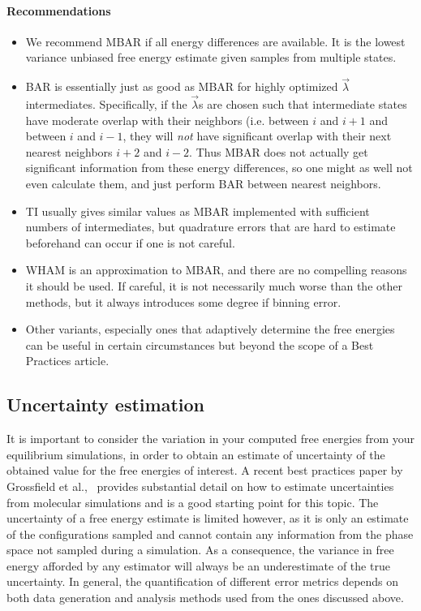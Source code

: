 \documentclass[9pt,bestpractices]{livecoms}
\begin{document}
\paragraph{Recommendations}
\begin{itemize}
\item We recommend MBAR if all energy differences are available. It is the lowest variance unbiased free energy estimate given samples from multiple states.
\item BAR is essentially just as good as MBAR for highly optimized $\vec{\lambda}$ intermediates. Specifically, if the $\vec{\lambda}$s are chosen such that intermediate states have moderate overlap with their neighbors (i.e. between $i$ and $i+1$ and between $i$ and $i-1$, they will \textit{not} have significant overlap with their next nearest neighbors $i+2$ and $i-2$. Thus MBAR does not actually get significant information from these energy differences, so one might as well not even calculate them, and just perform BAR between nearest neighbors.~\cite{paliwal2011benchmark} 
\item TI usually gives similar values as MBAR implemented with sufficient numbers of intermediates, but quadrature errors that are hard to estimate beforehand  can occur if one is not careful.~\cite{paliwal2011benchmark}
\item WHAM is an approximation to MBAR, and there are no compelling reasons it should be used. If careful, it is not necessarily much worse than the other methods, but it always introduces some degree if binning error.
\item Other variants, especially ones that adaptively determine the free energies can be useful in certain circumstances but beyond the scope of a Best Practices article.
\end{itemize}

\subsection{Uncertainty estimation}
\label{subsec:uncertainty}
It is important to consider the variation in your computed free energies from your equilibrium simulations, in order to obtain an estimate of uncertainty of the obtained value for the free energies of interest. A recent best practices paper by Grossfield et al.,~\cite{grossfield2018best} provides substantial detail on how to estimate uncertainties from molecular simulations and is a good starting point for this topic. 
The uncertainty of a free energy estimate is limited however, as it is only an estimate of the configurations sampled and cannot contain any information from the phase space not sampled during a simulation. As a consequence, the variance in free energy afforded by any estimator will always be an underestimate of the true uncertainty.
In general, the quantification of different error metrics depends on both data generation and analysis methods used from the ones discussed above. 
\end{document}
